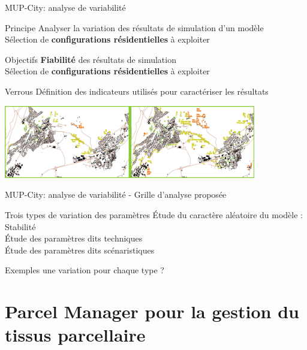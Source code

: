 \documentclass[xcolor=table]{beamer}
\begin{document}
\begin{frame}{MUP-City: analyse de variabilité}
	\begin{block}{Principe}
				Analyser la variation des résultats de simulation d'un modèle\\
				Sélection de \textbf{configurations résidentielles} à exploiter
			\end{block}

	\begin{block}{Objectifs}
				\textbf{Fiabilité} des résultats de simulation\\
				Sélection de \textbf{configurations résidentielles} à exploiter
			\end{block}

	\begin{block}{Verrous}
				Définition des indicateurs utilisés pour caractériser les résultats\\
			\end{block}
	\includegraphics[width=11cm]{Images/ex-sorties-mup2.png}
\end{frame}

\begin{frame}{MUP-City: analyse de variabilité - Grille d'analyse proposée}
	\begin{block}{Trois types de variation des paramètres}
		Étude du caractère aléatoire du modèle : \alert{Stabilité}\\
		Étude des paramètres dits \alert{techniques}\\
		Étude des paramètres dits \alert{scénaristiques}
	\end{block}
\end{frame}

\begin{frame}{Exemples}
	une variation pour chaque type ? 
\end{frame}

\section[Parcel Manager]{Parcel Manager pour la gestion du tissus parcellaire}
\end{document}
